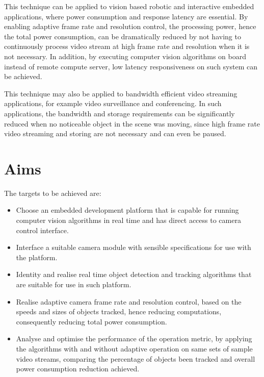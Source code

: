 This technique can be applied to vision based robotic and interactive embedded applications, where power consumption and response latency are essential. By enabling adaptive frame rate and resolution control, the processing power, hence the total power consumption, can be dramatically reduced by not having to continuously process video stream at high frame rate and resolution when it is not necessary. In addition, by executing computer vision algorithms on board instead of remote compute server, low latency responsiveness on such system can be achieved.

This technique may also be applied to bandwidth efficient video streaming applications, for example video surveillance and conferencing. In such applications, the bandwidth and storage requirements can be significantly reduced when no noticeable object in the scene was moving, since high frame rate video streaming and storing are not necessary and can even be paused.

\section{Aims}

\iffalse
Metric: power consumption vs accuracy?
What have done?
\fi

\iffalse
The aim of this project was to investigate ways to reduce overall power consumption of camera based real-time object detection and tracking applications, by applying feedback control of the camera module based on previous tracking results and utilising existing camera hardware capabilities including down sampling and cropping instead of software algorithms, while keeping a sensible accuracy. By doing so the average computation time would be dramatically reduced, hence reducing the overall power consumption.
\fi

The targets to be achieved are:

\begin{itemize}
	\item Choose an embedded development platform that is capable for running computer vision algorithms in real time and has direct access to camera control interface.
	\item Interface a suitable camera module with sensible specifications for use with the platform.
	\item Identity and realise real time object detection and tracking algorithms that are suitable for use in such platform.
	\item Realise adaptive camera frame rate and resolution control, based on the speeds and sizes of objects tracked, hence reducing computations, consequently reducing total power consumption.
	\item Analyse and optimise the performance of the operation metric, by applying the algorithms with and without adaptive operation on same sets of sample video streams, comparing the percentage of objects been tracked and overall power consumption reduction achieved.
\end{itemize}


